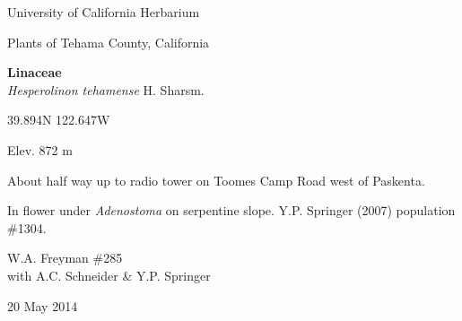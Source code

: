 \documentclass[letterpaper,10pt]{article}
\begin{document}
\begin{minipage}[t]{0.40\textwidth}

\begin{center}
University of California Herbarium \\
\begin{large}
Plants of Tehama County, California \\
\end{large}
\vspace{\baselineskip}
\textbf{Linaceae} \\
\textit{Hesperolinon tehamense} H. Sharsm.\\
\end{center}

\begin{footnotesize}

\begin{multicols}{2}
39.894\textdegree N 122.647\textdegree W
\columnbreak
\begin{flushright}
Elev. 872 m
\end{flushright}
\end{multicols}

About half way up to radio tower on Toomes Camp Road west of Paskenta.
\vspace{\baselineskip}

In flower under \textit{Adenostoma} on serpentine slope. Y.P. Springer (2007) population \#1304.

\begin{multicols}{2}
W.A. Freyman \#285 \\
with A.C. Schneider \& Y.P. Springer
\columnbreak
\begin{flushright}
20 May 2014
\end{flushright}
\end{multicols}

\end{footnotesize}

\end{minipage}

\vspace{2cm}
%
%

%
%
\end{document}
